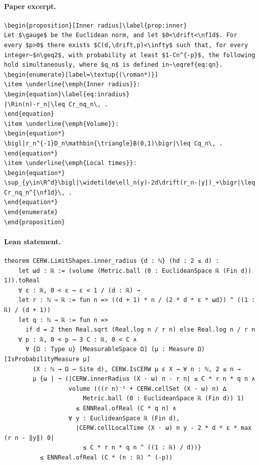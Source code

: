 \paragraph{Paper excerpt.}
\begin{verbatim}
\begin{proposition}[Inner radius]\label{prop:inner}
Let $\gauge$ be the Euclidean norm, and let $0<\drift<\nf1d$. For every $p>0$ there exists $C(d,\drift,p)<\infty$ such that, for every integer~$n\geq2$, with probability at least $1-Cn^{-p}$, the following hold simultaneously, where $q_n$ is defined in~\eqref{eq:qn}.
\begin{enumerate}[label=\textup{(\roman*)}]
\item \underline{\emph{Inner radius}}:
\begin{equation}\label{eq:inradius}
|\Rin(n)-r_n|\leq Cr_nq_n\, .
\end{equation}
\item \underline{\emph{Volume}}:
\begin{equation*}
\bigl|r_n^{-1}D_n\mathbin{\triangle}B(0,1)\bigr|\leq Cq_n\, .
\end{equation*}
\item \underline{\emph{Local times}}:
\begin{equation*}
\sup_{y\in\R^d}\bigl|\widetilde\ell_n(y)-2d\drift(r_n-|y|)_+\bigr|\leq Cr_nq_n^{\nf1d}\, .
\end{equation*}
\end{enumerate}
\end{proposition}
\end{verbatim}
\paragraph{Lean statement.}
\begin{verbatim}
theorem CERW.LimitShapes.inner_radius {d : ℕ} (hd : 2 ≤ d) :
    let ωd : ℝ := (volume (Metric.ball (0 : EuclideanSpace ℝ (Fin d)) 1)).toReal
    ∀ ε : ℝ, 0 < ε → ε < 1 / (d : ℝ) →
    let r : ℕ → ℝ := fun n => ((d + 1) * n / (2 * d * ε * ωd)) ^ ((1 : ℝ) / (d + 1))
    let q : ℕ → ℝ := fun n =>
      if d = 2 then Real.sqrt (Real.log n / r n) else Real.log n / r n
    ∀ p : ℝ, 0 < p → ∃ C : ℝ, 0 < C ∧
      ∀ {Ω : Type u} [MeasurableSpace Ω] (μ : Measure Ω) [IsProbabilityMeasure μ]
        (X : ℕ → Ω → Site d), CERW.IsCERW μ ε X → ∀ n : ℕ, 2 ≤ n →
        μ {ω | ¬ (|CERW.innerRadius (X · ω) n - r n| ≤ C * r n * q n ∧
                  volume (((r n)⁻¹ • CERW.cellSet (X · ω) n) ∆
                      Metric.ball (0 : EuclideanSpace ℝ (Fin d)) 1)
                    ≤ ENNReal.ofReal (C * q n) ∧
                  ∀ y : EuclideanSpace ℝ (Fin d),
                    |CERW.cellLocalTime (X · ω) n y - 2 * d * ε * max (r n - ‖y‖) 0|
                      ≤ C * r n * q n ^ ((1 : ℝ) / d))}
          ≤ ENNReal.ofReal (C * (n : ℝ) ^ (-p))
\end{verbatim}
